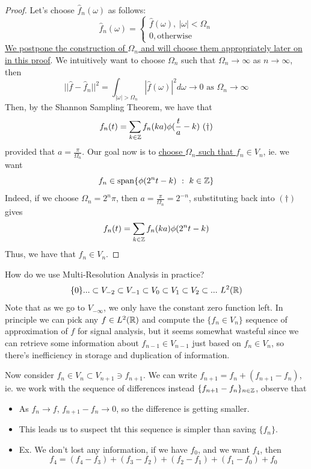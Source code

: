 \documentclass{article}
\begin{document}
\begin{proof}
Let's choose $\widehat{f}_n(\omega)$ as follows:
\[\widehat{f}_n(\omega) = \begin{cases}
    \widehat{f}(\omega),\ |\omega| < \Omega_n\\0, \text{otherwise}
\end{cases}\]
\ul{We postpone the construction of $\Omega_n$ and will choose them appropriately later on in this proof}. We intuitively want to choose $\Omega_n$ such that $\Omega_n \to \infty$ as $n \to \infty$, then
\[||\widehat{f} - \widehat{f}_n||^2 = \int_{|\omega| > \Omega_n} |\widehat{f}(\omega)|^2 d\omega \to 0 \text{ as } \Omega_n \to \infty\]
Then, by the Shannon Sampling Theorem, we have that
\[f_n(t) = \sum_{k \in \mathbb{Z}} f_n(ka) \phi(\frac{t}{a} - k)\ (\dagger)\]
provided that $a = \frac{\pi}{\Omega_n}$. Our goal now is to \ul{choose $\Omega_n$ such that $f_n \in V_n$}, ie. we want
\[f_n \in \spn \{\phi(2^n t - k)\ :\ k \in \Zbb\}\]
Indeed, if we choose $\Omega_n = 2^n \pi$, then $a = \frac{\pi}{\Omega_n} = 2^{-n}$, substituting back into $(\dagger)$ gives
\[f_n(t) = \sum_{k \in \mathbb{Z}} f_n(ka) \phi(2^n t - k)\]
Thus, we have that $f_n \in V_n$.
\end{proof}

\begin{question}
    How do we use Multi-Resolution Analysis in practice?
    \[\{0\}... \subset V_{-2} \subset V_{-1} \subset V_0 \subset V_1 \subset V_2 \subset ...\ L^2(\mathbb{R})\]
    Note that as we go to $V_{-\infty}$, we only have the constant zero function left. In principle we can pick any $f \in L^2(\mathbb{R})$ and compute the $\{f_n \in V_n\}$ sequence of approximation of $f$ for signal analysis, but it seems somewhat wasteful since we can retrieve some information about $f_{n-1} \in V_{n-1}$ just based on $f_n \in V_n$, so there's inefficiency in storage and duplication of information.
\end{question}

Now consider $f_n \in V_n \subset V_{n+1} \ni f_{n+1}$. We can write $f_{n+1} = f_n + (f_{n+1} - f_n)$, ie. we work with the sequence of differences instead $\{f_{n+1} - f_n\}_{n \in \mathbb{Z}}$, observe that
\begin{itemize}
    \item As $f_n \to f$, $f_{n+1} - f_n \to 0$, so the difference is getting smaller.
    \item This leads us to suspect tht this sequence is simpler than saving $\{f_n\}$.
    \item Ex. We don't lost any information, if we have $f_0$, and we want $f_4$, then
    \[f_4 = (f_4 - f_3) + (f_3 - f_2) + (f_2 - f_1) + (f_1 - f_0) + f_0\]
\end{itemize}
\end{document}
